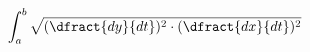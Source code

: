 \documentclass[preview]{standalone}
\begin{document}
\begin{align*}
\int_{a}^{b} \sqrt{(\dfract{dy}{dt})^2 \cdot (\dfract{dx}{dt})^2}
\end{align*}
\end{document}
